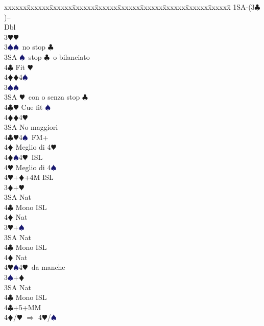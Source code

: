 \documentclass[a4paper,italian]{article}
\newcommand{\BC}{\textcolor{OliveGreen}{$\clubsuit$}}
\newcommand{\BD}{\textcolor{RedOrange}{$\vardiamondsuit$}}
\newcommand{\BH}{\textcolor{Red2}{$\varheartsuit${}}}
\newcommand{\BS}{\textcolor{MidnightBlue}{$\spadesuit${}}}
\newenvironment{bidtable}
{\begin{tabbing}

    xxxxxx\=xxxxxx\=xxxxxx\=xxxxxx\=xxxxxx\=xxxxxx\=xxxxxx\=xxxxxx\=xxxxxx\=xxxxxx\=\kill}
{\end{tabbing} }%
\begin{document}
\begin{multicols}{2}
\begin{itemize}
    \end{itemize}
    \begin{bidtable}
        1SA-(3\BC)--\+\\
        Dbl\+\\
        3\BH {}\BH \+\\
        3\BS {}\BS\ no stop \BC \\
        3SA \BS\ stop \BC\ o bilanciato\\
        4\BC \> Fit \BH \\
        4\BD {}\BD 4\BS \-\\
        3\BS {}\BS \+\\
        3SA \BH\ con o senza stop \BC \\
        4\BC\BH \> Cue fit \BS \\
        4\BD {}\BD 4\BH \-\\
        3SA \> No maggiori\+\\
        4\BC {}\BH 4\BS\ FM+\+\\
        4\BD \> Meglio di 4\BH \-\\
        4\BD {}\BS 4\BH\ ISL\+\\
        4\BH \> Meglio di 4\BS \-\\
        4\BH {}+\BD +4M ISL\-\-\\
        3\BD {}+\BH \+\\
        3SA \> Nat\+\\
        4\BC \> Mono ISL\\
        4\BD \> Nat\-\-\\
        3\BH {}+\BS \+\\
        3SA \> Nat\+\\
        4\BC \> Mono ISL\\
        4\BD \> Nat\\
        4\BH {}\BS 4\BH\ da manche\-\-\\
        3\BS {}+\BD \+\\
        3SA \> Nat\+\\
        4\BC \> Mono ISL\-\-\\
        4\BC {}+5+MM\\
        4\BD/\BH \> $\Rightarrow$ 4\BH /\BS \-
    \end{bidtable}
    \columnbreak


\end{multicols}
\end{document}

